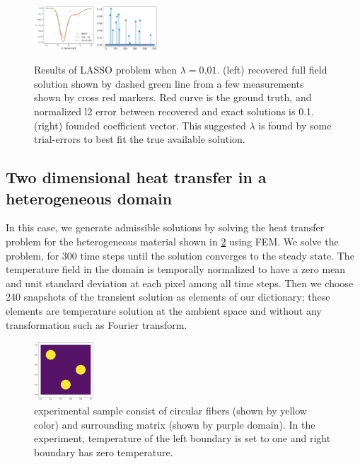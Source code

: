\documentclass[conference]{IEEEtran}
\begin{document}
\begin{figure}[!ht]
  \centering
  \includegraphics[width=0.2\textwidth]{figure/toy_lasso_sol_noisy.png}
  \hspace{0.01\textwidth}
  \includegraphics[width=0.2\textwidth]{figure/toy_lasso_coeff_noisy.png}
  \caption{Results of LASSO problem when $\lambda=0.01$. (left) recovered full field solution shown by dashed green line from a few measurements shown by cross red markers. Red curve is the ground truth, and normalized l2 error between recovered and exact solutions is 0.1. (right) founded coefficient vector. This suggested $\lambda$ is found by some trial-errors to best fit the true available solution.}\label{fig::toy-lasso-noisy}
\end{figure}



\subsection{Two dimensional heat transfer in a heterogeneous domain}
In this case, we generate admissible solutions by solving the heat transfer problem for the heterogeneous material shown in \ref{fig::prob-dom} using FEM. We solve the problem, for 300 time steps until the solution converges to the steady state. The temperature field in the domain is temporally normalized to have a zero mean and unit standard deviation at each pixel among all time steps. Then we choose 240 snapshots of the transient solution as elements of our dictionary; these elements are temperature solution at the ambient space and without any transformation such as Fourier transform.

\begin{figure}[!ht]
  \centering
  \includegraphics[width=0.2\textwidth]{figure/prob-dom.png}
  \caption{experimental sample consist of circular fibers (shown by yellow color) and surrounding matrix (shown by purple domain). In the experiment, temperature of the left boundary is set to one and right boundary has zero temperature.}\label{fig::prob-dom}
\end{figure}
\end{document}
